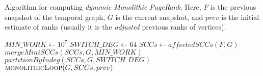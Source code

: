 \vspace{2em}
\begin{algorithm}[!hbtp]
\caption{Algorithm for computing \emph{dynamic Monolithic PageRank}. Here, $F$ is the previous snapshot of the temporal graph, $G$ is the current snapshot, and $prev$ is the initial estimate of ranks (usually it is the \emph{adjusted} previous ranks of vertices).}
\label{alg:pr-monolithic}
\begin{algorithmic}
  \State $MIN\_WORK \gets 10^7$ 
  \State $SWITCH\_DEG \gets 64$ 
  \State $SCCs \gets affectedSCCs(F, G)$
    \State $mergeMiniSCCs(SCCs, G, MIN\_WORK)$
    \State $partitionByIndeg(SCCs, G, SWITCH\_DEG)$
  \EndIf
  \Return $\textsc{monolithicLoop}(G, SCCs, prev)$ \\  
\EndFunction
\end{algorithmic}
\end{algorithm}
\vspace{1em}